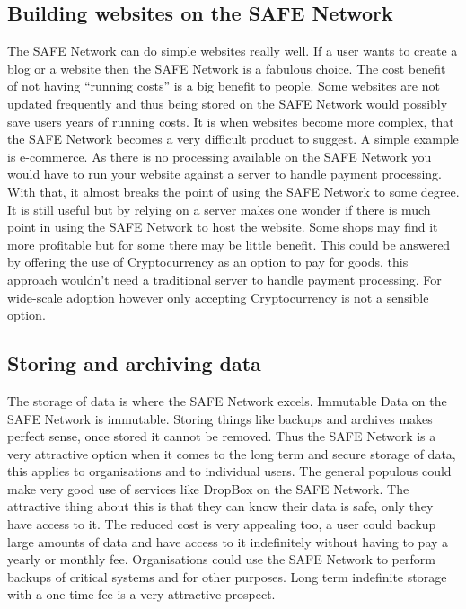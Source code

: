 \subsection{Building websites on the SAFE Network}

The SAFE Network can do simple websites really well. If a user wants to create a blog or a website then the SAFE Network is a fabulous choice. The cost benefit of not having ``running costs'' is a big benefit to people. Some websites are not updated frequently and thus being stored on the SAFE Network would possibly save users years of running costs. It is when websites become more complex, that the SAFE Network becomes a very difficult product to suggest. A simple example is e-commerce. As there is no processing available on the SAFE Network you would have to run your website against a server to handle payment processing. With that, it almost breaks the point of using the SAFE Network to some degree. It is still useful but by relying on a server makes one wonder if there is much point in using the SAFE Network to host the website. Some shops may find it more profitable but for some there may be little benefit. This could be answered by offering the use of Cryptocurrency as an option to pay for goods, this approach wouldn't need a traditional server to handle payment processing. For wide-scale adoption however only accepting Cryptocurrency is not a sensible option.

\subsection{Storing and archiving data}

The storage of data is where the SAFE Network excels. Immutable Data on the SAFE Network is immutable. Storing things like backups and archives makes perfect sense, once stored it cannot be removed. Thus the SAFE Network is a very attractive option when it comes to the long term and secure storage of data, this applies to organisations and to individual users. The general populous could make very good use of services like DropBox on the SAFE Network. The attractive thing about this is that they can know their data is safe, only they have access to it. The reduced cost is very appealing too, a user could backup large amounts of data and have access to it indefinitely without having to pay a yearly or monthly fee. Organisations could use the SAFE Network to perform backups of critical systems and for other purposes. Long term indefinite storage with a one time fee is a very attractive prospect.

